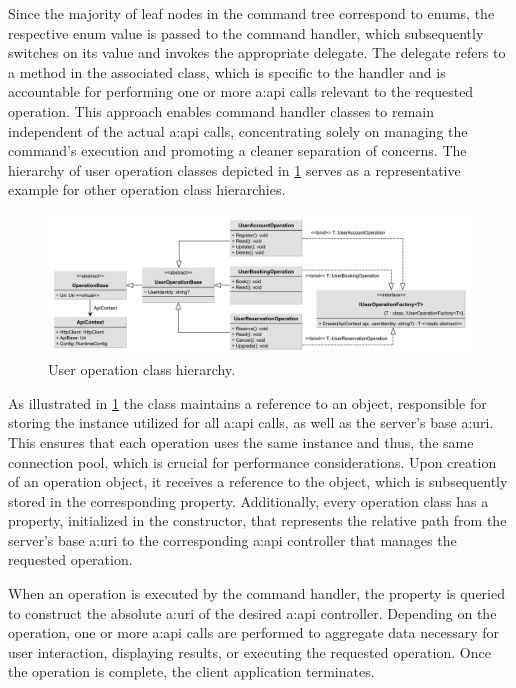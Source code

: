 Since the majority of leaf nodes in the command tree correspond to enums, the respective enum value is passed to the command handler, which subsequently switches on its value and invokes the appropriate  delegate. The  delegate refers to a method in the associated  class, which is specific to the handler and is accountable for performing one or more \gls{a:api} calls relevant to the requested operation. This approach enables command handler classes to remain independent of the actual \gls{a:api} calls, concentrating solely on managing the command's execution and promoting a cleaner separation of concerns. The hierarchy of user operation classes depicted in \cref{fig:client-operations} serves as a representative example for other operation class hierarchies.

\begin{figure}[H]
    \centering
    \includegraphics[width=\textwidth]{images/client-operations}
    \caption{User operation class hierarchy.}
    \label{fig:client-operations}
\end{figure}


As illustrated in \cref{fig:client-operations} the  class maintains a reference to an  object, responsible for storing the  instance utilized for all \gls{a:api} calls, as well as the server's base \gls{a:uri}. This ensures that each operation uses the same  instance and thus, the same connection pool, which is crucial for performance considerations. Upon creation of an operation object, it receives a reference to the  object, which is subsequently stored in the corresponding property. Additionally, every operation class has a  property, initialized in the constructor, that represents the relative path from the server's base \gls{a:uri} to the corresponding \gls{a:api} controller that manages the requested operation.

When an operation is executed by the command handler, the  property is queried to construct the absolute \gls{a:uri} of the desired \gls{a:api} controller. Depending on the operation, one or more \gls{a:api} calls are performed to aggregate data necessary for user interaction, displaying results, or executing the requested operation. Once the operation is complete, the client application terminates.

